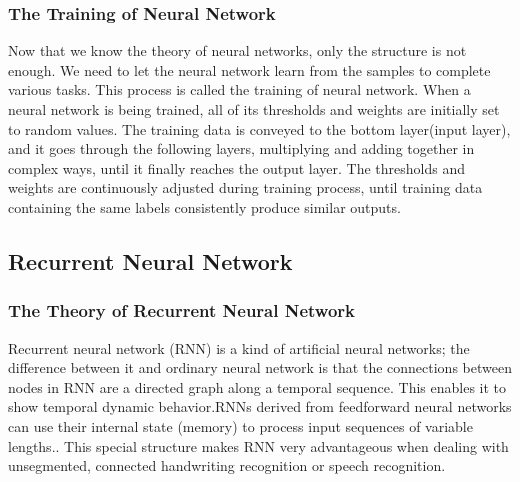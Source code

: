 \subsubsection{The Training of Neural Network}
Now that we know the theory of neural networks, only the structure is not enough. We need to let the neural network learn from the samples to complete various tasks. This process is called the training of neural network. When a neural network is being trained, all of its thresholds and weights are initially set to random values. The training data is conveyed to the bottom layer(input layer), and it goes through the following layers, multiplying and adding together in complex ways, until it finally reaches the output layer. The thresholds and weights are continuously adjusted during training process, until training data containing the same labels consistently produce similar outputs\cite{MIT-NN}.
\subsection{Recurrent Neural Network}
\subsubsection{The Theory of Recurrent Neural Network}
Recurrent neural network (RNN) is a kind of artificial neural networks; the difference between it and ordinary neural network is that the connections between nodes in RNN are a directed graph along a temporal sequence. This enables it to show temporal dynamic behavior.RNNs derived from feedforward neural networks can use their internal state (memory) to process input sequences of variable lengths.\cite{dupond2019thorough}. This special structure makes RNN very advantageous when dealing with unsegmented, connected handwriting recognition\cite{fernandez2009novel} or speech recognition.\cite{sak2014long} \cite{li2015constructing}
